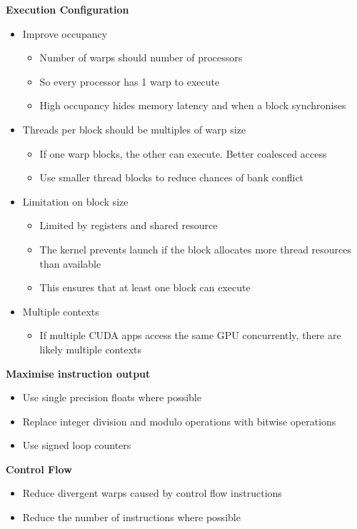 \documentclass[10pt, landscape]{article}
\begin{document}
\begin{multicols}{4}
\textbf{Execution Configuration}
\begin{itemize}
    \item Improve occupancy
    \begin{itemize}
        \item Number of warps should \> number of processors 
        \item So every processor has 1 warp to execute 
        \item High occupancy hides memory latency and when a block synchronises 
    \end{itemize}
    \item Threads per block should be multiples of warp size 
    \begin{itemize}
        \item If one warp blocks, the other can execute. Better coalesced access
        \item Use smaller thread blocks to reduce chances of bank conflict
    \end{itemize}
    \item Limitation on block size 
    \begin{itemize}
        \item Limited by registers and shared resource 
        \item The kernel prevents launch if the block allocates more thread resources than available
        \item This ensures that at least one block can execute 
    \end{itemize}
    \item Multiple contexts 
    \begin{itemize}
        \item If multiple CUDA apps access the same GPU concurrently, there are likely multiple contexts
    \end{itemize}
\end{itemize}

\textbf{Maximise instruction output}
\begin{itemize}
    \item Use single precision floats where possible 
    \item Replace integer division and modulo operations with bitwise operations 
    \item Use signed loop counters 
\end{itemize}

\textbf{Control Flow}
\begin{itemize}
    \item Reduce divergent warps caused by control flow instructions 
    \item Reduce the number of instructions where possible
\end{itemize}


\end{multicols}
\end{document}
